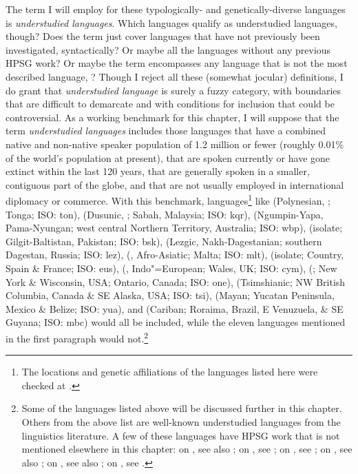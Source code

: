 \documentclass[output=paper,biblatex,babelshorthands,newtxmath,draftmode,colorlinks,citecolor=brown]{langscibook}
\begin{document}
\largerpage[2]
The term I will employ for these typologically- and genetically-diverse languages is
\emph{understudied languages}. Which languages qualify as understudied languages, though? Does the
term just cover languages that have not previously been investigated, syntactically? Or maybe all
the languages without any previous HPSG work? Or maybe the term encompasses any language that is not
the most described language, ? Though I reject all these (somewhat jocular)
definitions, I do grant that \textit{understudied language} is surely a fuzzy category, with
boundaries that are difficult to demarcate and with conditions for inclusion that could be
controversial. As a working benchmark for this chapter, I will suppose that the term
\textit{understudied languages} includes those languages that have a combined native and non-native
speaker population of 1.2 million or fewer (roughly 0.01\% of the world's population at present),
that are spoken currently or have gone extinct within the last 120 years, that are generally spoken
in a smaller, contiguous part of the globe, and that are not usually employed in international
diplomacy or commerce. With this benchmark, languages\footnote{The locations and genetic
  affiliations of the languages listed here were checked at \citet{glottolog18}.} like
 (Polynesian, ; Tonga; ISO: ton), 
 (Dusunic, ; Sabah, Malaysia; ISO: kqr),
 (Ngumpin-Yapa, Pama-Nyungan; west central Northern Territory, Australia; ISO: wbp), 
 (isolate; Gilgit-Baltistan, Pakistan; ISO: bsk), 
 (Lezgic, Nakh-Dagestanian; southern Dagestan, Russia; ISO: lez), 
 (, Afro-Asiatic; Malta; ISO: mlt), 
 (isolate;  Country, Spain \& France; ISO: eus),  
 (, Indo"=European; Wales, UK; ISO: cym), 
 (; New York \& Wisconsin, USA; Ontario, Canada; ISO: one), 
 (Tsimshianic; NW British Columbia, Canada \& SE Alaska, USA; ISO: tsi),
 (Mayan; Yucatan Peninsula, Mexico \& Belize; ISO: yua), and
 (Cariban; Roraima, Brazil, E Venuzuela, \& SE Guyana; ISO: mbc)
would all be included, while the eleven languages mentioned in the first paragraph would
not.\footnote{\label{list expln}Some of the languages listed above will be discussed further in this
  chapter. Others from the above list are well-known understudied languages from the linguistics
  literature. A few of these languages have HPSG work that is not mentioned elsewhere in this
  chapter: on , see also \citet{dukes2000}; on , see \citet{donosag99}; on
  , see \citet{MuellerMalteseSketch}; 
on , see also \citet{CB11}; on , see also \citet{KM2010a-u}; on , see \citet{dabkowski17}.}   
\end{document}
